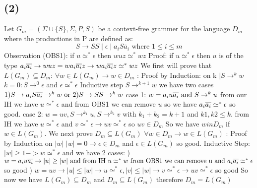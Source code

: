 \documentclass[12pt]{article}
\begin{document}
\subsection*{(2)} Let $G_m = (\Sigma\cup \{S\},\Sigma,P,S)$ be a context-free
grammer for the language $D_m$ where the productions in P are defined as:
$$S \rightarrow SS\mid \epsilon \mid a_iS\bar a_i \text{ where } 1\le i\le m$$
Observation (OBS1): if $u \simeq^* \epsilon$ then $wuz \simeq^* wz$\newline
Proof: if $u \simeq^* \epsilon$ then $u$ is of the type $a_i\overline{a_i} \rightarrow wuz = wa_i\overline{a_i}z \rightarrow wa_i\overline{a_i}z \simeq^* wz$\newline
We first will prove that $L(G_m) \subseteq D_m$:\newline
$\forall w \in L(G_m) \rightarrow w \in D_m$ : Proof by Induction: on k $\mid S \rightarrow^k w$\newline
$k = 0 : S \rightarrow^0 \epsilon$ and $\epsilon \simeq^* \epsilon$\newline
Inductive step \newline
$S \rightarrow^{k+1} w$ we have two cases $1) S \rightarrow a_iS\overline{a_i} \rightarrow^{k} w \text{ or } 2)S \rightarrow SS \rightarrow^{k} w$\newline
case 1: $w = a_iu\overline{a_i} \text{ and } S \rightarrow^k u$ from our IH we have $u \simeq^* \epsilon$ and from OBS1 we can remove $u$ so we have $a_i\overline{a_i} \simeq^* \epsilon$ so good.\newline
case 2: $w = uv , S\rightarrow^{k_1} u , S\rightarrow^{k_2} v$ with $k_1 + k_2 = k + 1$ and $k1, k2 \le k$.\newline
from IH we have $u \simeq^* \epsilon$ and $v \simeq^* \epsilon \rightarrow uv  \simeq^* \epsilon$ so $uv \in D_m$
So we have $w in D_m$ if $w \in L(G_m)$.\newline
We next prove $D_m \subseteq L(G_m)$
$\forall w \in D_m \rightarrow w \in L(G_m)$ : Proof by Induction on $|w|$\newline
$|w| = 0 \rightarrow \epsilon \in D_m$ and $\epsilon \in L(G_m)$ so good.\newline
Inductive Step:\newline
$|w| \ge 1 -> w \simeq^* \epsilon$ and we have 2 cases: ) $w = a_iu\overline{a_i} \rightarrow |u| \ge |w| \text{ and from IH } u \simeq^* w \text{ from OBS1 we can remove u and } a_i\overline{a_i} \simeq^* \epsilon$ so good ) $w=uv \rightarrow |u| \le |w| \rightarrow u \simeq^* \epsilon , |v| \le |w| \rightarrow v \simeq^* \epsilon \rightarrow uv \simeq^* \epsilon$ so good\newline
So now we have $L(G_m) \subseteq D_m \text{ and } D_m \subseteq L(G_m) \text{ therefore } D_m = L(G_m)$
\end{document}
